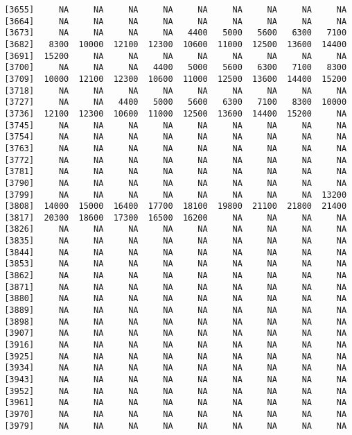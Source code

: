 \documentclass[]{article}
\begin{document}
\begin{verbatim}
 [3655]     NA     NA     NA     NA     NA     NA     NA     NA     NA
 [3664]     NA     NA     NA     NA     NA     NA     NA     NA     NA
 [3673]     NA     NA     NA     NA   4400   5000   5600   6300   7100
 [3682]   8300  10000  12100  12300  10600  11000  12500  13600  14400
 [3691]  15200     NA     NA     NA     NA     NA     NA     NA     NA
 [3700]     NA     NA     NA   4400   5000   5600   6300   7100   8300
 [3709]  10000  12100  12300  10600  11000  12500  13600  14400  15200
 [3718]     NA     NA     NA     NA     NA     NA     NA     NA     NA
 [3727]     NA     NA   4400   5000   5600   6300   7100   8300  10000
 [3736]  12100  12300  10600  11000  12500  13600  14400  15200     NA
 [3745]     NA     NA     NA     NA     NA     NA     NA     NA     NA
 [3754]     NA     NA     NA     NA     NA     NA     NA     NA     NA
 [3763]     NA     NA     NA     NA     NA     NA     NA     NA     NA
 [3772]     NA     NA     NA     NA     NA     NA     NA     NA     NA
 [3781]     NA     NA     NA     NA     NA     NA     NA     NA     NA
 [3790]     NA     NA     NA     NA     NA     NA     NA     NA     NA
 [3799]     NA     NA     NA     NA     NA     NA     NA     NA  13200
 [3808]  14000  15000  16400  17700  18100  19800  21100  21800  21400
 [3817]  20300  18600  17300  16500  16200     NA     NA     NA     NA
 [3826]     NA     NA     NA     NA     NA     NA     NA     NA     NA
 [3835]     NA     NA     NA     NA     NA     NA     NA     NA     NA
 [3844]     NA     NA     NA     NA     NA     NA     NA     NA     NA
 [3853]     NA     NA     NA     NA     NA     NA     NA     NA     NA
 [3862]     NA     NA     NA     NA     NA     NA     NA     NA     NA
 [3871]     NA     NA     NA     NA     NA     NA     NA     NA     NA
 [3880]     NA     NA     NA     NA     NA     NA     NA     NA     NA
 [3889]     NA     NA     NA     NA     NA     NA     NA     NA     NA
 [3898]     NA     NA     NA     NA     NA     NA     NA     NA     NA
 [3907]     NA     NA     NA     NA     NA     NA     NA     NA     NA
 [3916]     NA     NA     NA     NA     NA     NA     NA     NA     NA
 [3925]     NA     NA     NA     NA     NA     NA     NA     NA     NA
 [3934]     NA     NA     NA     NA     NA     NA     NA     NA     NA
 [3943]     NA     NA     NA     NA     NA     NA     NA     NA     NA
 [3952]     NA     NA     NA     NA     NA     NA     NA     NA     NA
 [3961]     NA     NA     NA     NA     NA     NA     NA     NA     NA
 [3970]     NA     NA     NA     NA     NA     NA     NA     NA     NA
 [3979]     NA     NA     NA     NA     NA     NA     NA     NA     NA

\end{verbatim}
\end{document}

